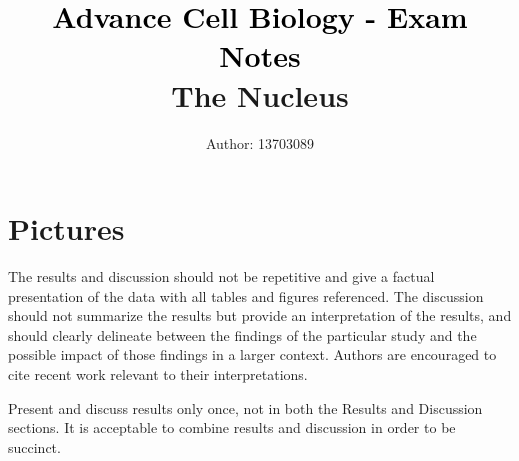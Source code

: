 \documentclass[10pt]{cls/labreport}
\title{\vspace*{2cm}\textcolor{black}{Advance Cell Biology - Exam Notes}\\
{\Large The Nucleus}}
\author[1]{Author: 13703089}
\affil[1]{BSc Biomedicine$^{\ast}$}
\begin{document}
\maketitle
\thispagestyle{firststyle}
\vspace{-13pt}%

%
\twocolstart
\section{Pictures}
The results and discussion should not be repetitive and give a factual presentation of the data with all tables and figures referenced. The discussion should not summarize the results but provide an interpretation of the results, and should clearly delineate between the findings of the particular study and the possible impact of those findings in a larger context. Authors are encouraged to cite recent work relevant to their interpretations.\\[1em]
\twocolend


Present and discuss results only once, not in both the Results and Discussion sections. It is acceptable to combine results and discussion in order  to be succinct.\\[4em]




%
%
\end{document}
